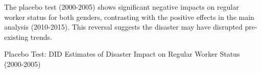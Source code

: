 \documentclass[serif, aspectratio=169]{beamer}
\newcommand{\returnbutton}[2]{%
  \vspace{-1.0cm}  %
  \hfill  %
  \hyperlink{#1}{%
    {\footnotesize\beamerbutton{#2}}%
  }%
  \vspace{0.3cm}  %
}
\begin{document}
\begin{frame}[label=regular_placebo]

The placebo test (2000-2005) shows significant negative impacts on regular worker status for both genders, contrasting with the positive effects in the main analysis (2010-2015). This reversal suggests the disaster may have disrupted pre-existing trends.


\vspace{-1.0cm}
\returnbutton{regular_status}{Return}
\vspace{1.2cm}

\begin{table}[htbp]
\centering
\caption{Placebo Test: DID Estimates of Disaster Impact on Regular Worker Status (2000-2005)}

\vspace{-0.2cm}



\end{table}
\end{frame}
\end{document}
